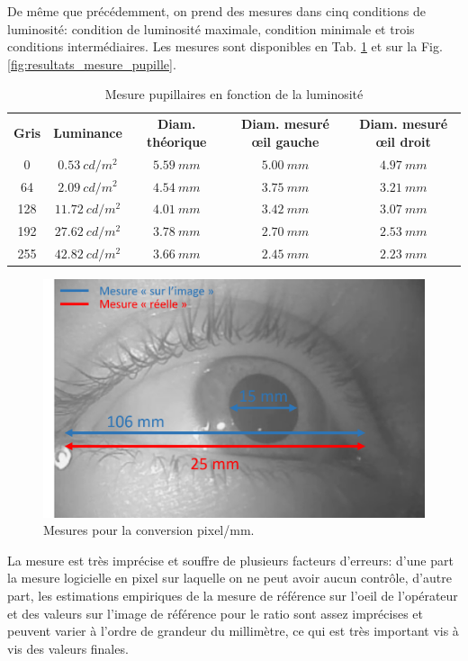 	\par De même que précédemment, on prend des mesures	dans cinq conditions de luminosité: condition de luminosité maximale, condition minimale et trois conditions intermédiaires. Les mesures sont disponibles en Tab. \ref{tab:mesure_pupillaire} et sur la Fig. \ref{fig:resultats_mesure_pupille}.
	
	\begin{table}[h]	
		\centering
		\caption{Mesure pupillaires en fonction de la luminosité}
		\label{tab:mesure_pupillaire}
		\small
		\begin{tabular}{ccccc}
			\textbf{Gris} & \textbf{Luminance} & \textbf{Diam. théorique} & \textbf{Diam. mesuré œil gauche} & \textbf{Diam. mesuré œil droit}\\
			0 & $0.53~cd/m^2$ & $5.59~mm$ & $5.00~mm$ & $4.97~mm$\\
			64 & $2.09~cd/m^2$ & $4.54~mm$ & $3.75~mm$ & $3.21~mm$\\
			128 & $11.72~cd/m^2$ & $4.01~mm$ & $3.42~mm$ & $3.07~mm$\\
			192 & $27.62~cd/m^2$ & $3.78~mm$ & $2.70~mm$ & $2.53~mm$\\
			255 & $42.82~cd/m^2$ & $3.66~mm$ & $2.45~mm$ & $2.23~mm$\\
		\end{tabular}
	\end{table}
	
	\begin{figure}[h]
		\centering
		\includegraphics[scale=.7]{Figures/MesureReferenceOeil}
		\caption{Mesures pour la conversion pixel/mm.}
		\label{fig:mesure_reference}
	\end{figure}
	
	\par La mesure est très imprécise et souffre de plusieurs facteurs d'erreurs: d'une part la mesure logicielle en pixel sur laquelle on ne peut avoir aucun contrôle, d'autre part, les estimations empiriques de la mesure de référence sur l'oeil de l'opérateur et des valeurs sur l'image de référence pour le ratio sont assez imprécises et peuvent varier à l'ordre de grandeur du millimètre, ce qui est très important vis à vis des valeurs finales.
	
